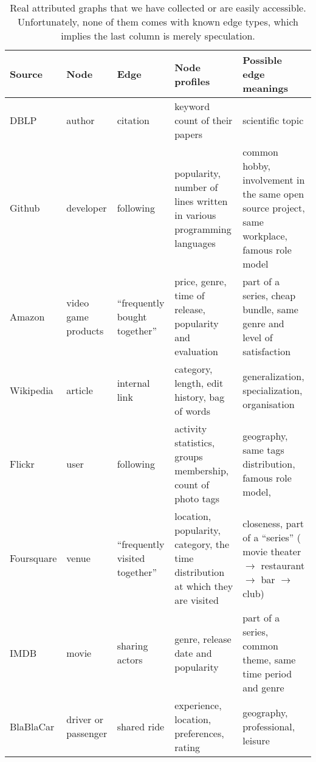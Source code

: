 \setlength{\fullpage}{\textwidth+\marginparsep+\marginparwidth}
\begin{table}[h]
  \small
  \setlength{\tabcolsep}{4pt}
  \centering
  \caption{Real attributed graphs that we have collected or are easily accessible. Unfortunately,
    none of them comes with known edge types, which implies the last column is merely speculation.
  \label{tab:edge_apps}}
  {\renewcommand{\arraystretch}{0.95}%
  \begin{tabulary}{\fullpage}{lLLLL}
    \toprule
    {Source} & {Node} & {Edge} & {Node profiles} & {Possible edge meanings} \\
    \midrule
    DBLP & author & citation & keyword count of their papers & scientific topic \\
    Github & developer & following & popularity, number of lines written in various programming languages &
    common hobby, involvement in the same open source project, same
    workplace, famous role model \\
    Amazon & video game products & \enquote{frequently bought together} & price, genre, time of release, popularity and evaluation &
    part of a series, cheap bundle, same genre and level of satisfaction \\
    Wikipedia & article & internal link & category, length, edit history, bag of words &
    generalization, specialization, organisation \\
    Flickr & user & following & activity statistics, groups membership, count of photo tags &
    geography, same tags distribution, famous role model,  \\ 
    Foursquare & venue & \enquote{frequently visited together} & location, popularity, category, the time distribution at which they are visited &
    closeness, part of a \enquote{series} (\eg{} movie theater $\rightarrow$ restaurant $\rightarrow$
    bar $\rightarrow$ club) \\
    IMDB & movie & sharing actors & genre, release date and popularity &
    part of a series, common theme, same time period and genre \\
    BlaBlaCar & driver or passenger & shared ride & experience, location, preferences, rating &
    geography, professional, leisure \\
    \bottomrule
  \end{tabulary}}
\end{table}

